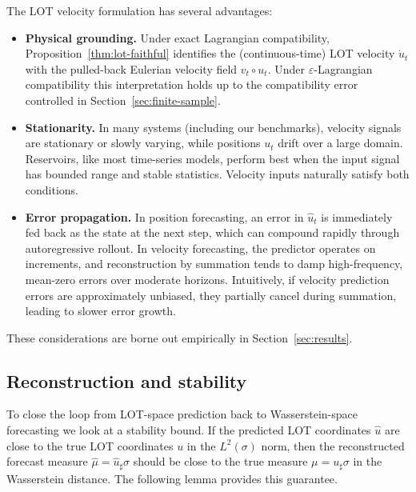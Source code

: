 \documentclass[11pt]{article}
\newcommand{\1}{\mathbf{1}}
\begin{document}
\begin{remark}\label{rem:why-velocity}
The LOT velocity formulation has several advantages:
\begin{itemize}
\item \textbf{Physical grounding.} Under exact Lagrangian compatibility, Proposition~\ref{thm:lot-faithful} identifies the (continuous-time) LOT velocity $\dot u_t$ with the pulled-back Eulerian velocity field $v_t\circ u_t$. Under
$\varepsilon$-Lagrangian compatibility this interpretation holds up to the compatibility error controlled in Section~\ref{sec:finite-sample}. 

\item \textbf{Stationarity.} In many systems (including our benchmarks), velocity signals are stationary or slowly varying, while positions $u_t$ drift over a large domain. Reservoirs, like most time-series models, perform best when the input signal has bounded range and stable statistics. Velocity inputs naturally satisfy both conditions. 

\item \textbf{Error propagation.} In position forecasting, an error in $\widehat{u}_t$ is immediately fed back as the state at the next step, which can compound rapidly through autoregressive rollout. In velocity forecasting, the predictor operates on increments, and reconstruction by summation tends to damp high-frequency, mean-zero errors over moderate horizons. Intuitively, if velocity prediction errors are approximately unbiased, they partially cancel during summation, leading to slower error growth.
\end{itemize}
These considerations are borne out empirically in Section~\ref{sec:results}.
\end{remark}


\subsection{Reconstruction and stability}\label{sec:reconstruction}

To close the loop from LOT-space prediction back to Wasserstein-space forecasting we look at a stability bound. If the predicted LOT coordinates $\widehat{u}$ are close to the true LOT coordinates $u$ in the $L^2(\sigma)$ norm, then the reconstructed forecast measure $\widehat{\mu} = \widehat{u}_\sharp \sigma$ should be close to the true measure $\mu = u_\sharp \sigma$ in the Wasserstein distance. The following lemma provides this guarantee. \\
\end{document}
